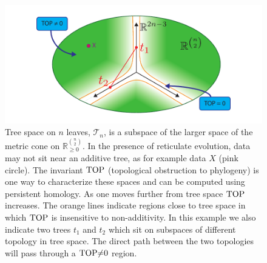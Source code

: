 \begin{figure}
	\centering
	\includegraphics[]{./fig/background/tree_space_revisited_v3.pdf}
	\caption[Topology expands tree space to include reticulation]{Tree space on $n$ leaves, $\mathcal{T}_{n}$, is a subspace of the larger space of the metric cone on $\mathbb{R}^{\binom{n}{2}}_{\geq0}$. In the presence of reticulate evolution, data may not sit near an additive tree, as for example data $X$ (pink circle). The invariant $\operatorname{TOP}$ (topological obstruction to phylogeny) is one way to characterize these spaces and can be computed using persistent homology. As one moves further from tree space $\operatorname{TOP}$ increases. The orange lines indicate regions close to tree space in which $\operatorname{TOP}$ is insensitive to non-additivity. In this example we also indicate two trees $t_{1}$ and $t_{2}$ which sit on subspaces of different topology in tree space. The direct path between the two topologies will pass through a ${\operatorname{TOP}}{\neq}{0}$ region.}
	\label{fig:bg:tree_space_revisited}
\end{figure}